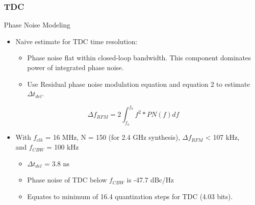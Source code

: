 \documentclass[t, screen, aspectratio=43]{beamer}
\begin{document}
\begin{frame}
	\frametitle{TDC}
	\begin{block}{Phase Noise Modeling}
		\begin{itemize}
			\footnotesize
			\item Naive estimate for TDC time resolution:
			\begin{itemize}
				\scriptsize
				\item Phase noise flat within closed-loop bandwidth. This component dominates power of integrated phase noise.
				\item Use Residual phase noise modulation equation and equation 2 to estimate $\Delta t_{del}$. 
			\end{itemize} 
			\begin{equation}
				\Delta f_{RFM} = 2\int_{f_a}^{f_b}f^2*PN(f)df
			\end{equation}
			\item With $f_{clk}$ = 16 MHz, N = 150 (for 2.4 GHz synthesis), $\Delta f_{RFM}$ < 107 kHz, and $f_{CBW}$ = 100 kHz
 			\begin{itemize}
				\scriptsize			
				\item $\Delta t_{del}$ = 3.8 ns
				\item Phase noise of TDC below $f_{CBW}$ is -47.7 dBc/Hz
				\item Equates to minimum of 16.4 quantization steps for TDC (4.03 bits).

			\end{itemize} 
		\end{itemize}   
	\end{block}
\end{frame}


\end{document}
